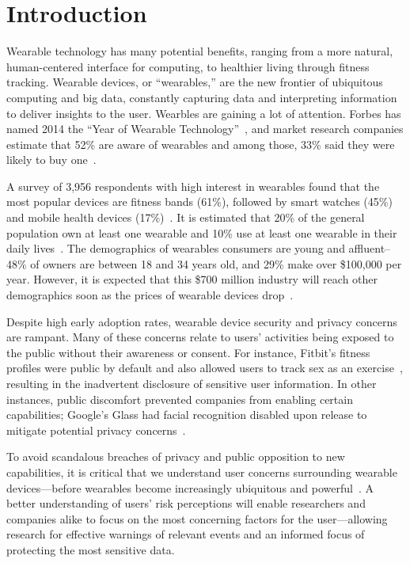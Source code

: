 \documentclass{acm_proc_article-sp}
\begin{document}



\section{Introduction}
Wearable technology has many potential benefits, ranging from a more natural, human-centered interface for computing, to healthier living through fitness tracking. Wearable devices, or ``wearables,'' are the new frontier of ubiquitous computing and big data, constantly capturing data and interpreting information to deliver insights to the user. Wearbles are gaining a lot of attention. Forbes has named 2014 the ``Year of Wearable Technology''~\cite{Forbes}, and market research companies estimate that 52\% are aware of wearables and among those, 33\% said they were likely to buy one~\cite{NPD}. 

A survey of 3,956 respondents with high interest in wearables found that the most popular devices are fitness bands (61\%), followed by smart watches (45\%) and mobile health devices (17\%)~\cite{Nilsen}. It is estimated that 20\% of the general population own at least one wearable and 10\% use at least one wearable in their daily lives~\cite{WearableStatNews}. The demographics of wearables consumers are young and affluent--48\% of owners are between 18 and 34 years old, and 29\% make over \$100,000 per year. However, it is expected that this \$700 million industry will reach other demographics soon as the prices of wearable devices drop~\cite{cmo}. 

Despite high early adoption rates, wearable device security and privacy concerns are rampant. Many of these concerns relate to users' activities being exposed to the public without their awareness or consent. For instance, Fitbit's fitness profiles were public by default and also allowed users to track sex as an exercise~\cite{Fitbit}, resulting in the inadvertent disclosure of sensitive user information. In other instances, public discomfort prevented companies from enabling certain capabilities; Google's Glass had facial recognition disabled upon release to mitigate potential privacy concerns~\cite{GlassDetection}.

To avoid scandalous breaches of privacy and public opposition to new capabilities, it is critical that we understand user concerns surrounding wearable devices---before wearables become increasingly ubiquitous and powerful~\cite{Implants}. A better understanding of users' risk perceptions will enable researchers and companies alike to focus on the most concerning factors for the user---allowing research for effective warnings of relevant events and an informed focus of protecting the most sensitive data.
\end{document}
